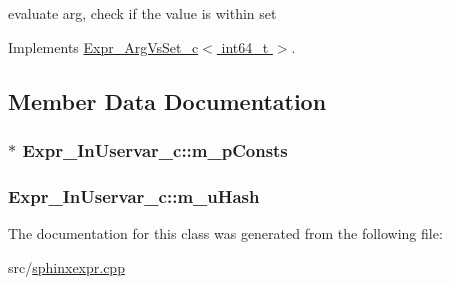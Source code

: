 evaluate arg, check if the value is within set 



Implements \hyperlink{classExpr__ArgVsSet__c_a2b37f6f558473937dff6330f7cff7897}{Expr\-\_\-\-Arg\-Vs\-Set\-\_\-c$<$ int64\-\_\-t $>$}.



\subsection{Member Data Documentation}
\hypertarget{classExpr__InUservar__c_a7f8d487e17c9399ffeb53852c32cfe95}{
\subsubsection[{m\-\_\-p\-Consts}]{$\ast$ Expr\-\_\-\-In\-Uservar\-\_\-c\-::m\-\_\-p\-Consts\hspace{0.3cm}{\ttfamily [protected]}}}\label{classExpr__InUservar__c_a7f8d487e17c9399ffeb53852c32cfe95}
\hypertarget{classExpr__InUservar__c_a70f97222d4bfbbc9865acbb02f4e8951}{
\subsubsection[{m\-\_\-u\-Hash}]{ Expr\-\_\-\-In\-Uservar\-\_\-c\-::m\-\_\-u\-Hash\hspace{0.3cm}{\ttfamily [protected]}}}\label{classExpr__InUservar__c_a70f97222d4bfbbc9865acbb02f4e8951}


The documentation for this class was generated from the following file\-:\begin{DoxyCompactItemize}
\item 
src/\hyperlink{sphinxexpr_8cpp}{sphinxexpr.\-cpp}\end{DoxyCompactItemize}
